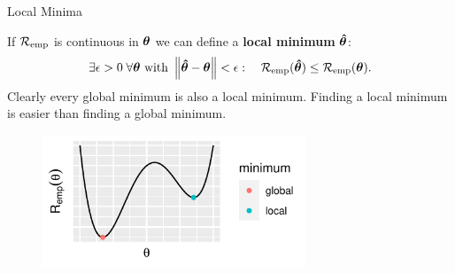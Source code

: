 \documentclass[11pt,compress,t,notes=noshow, xcolor=table]{beamer}
\begin{document}
\begin{vbframe}{Local Minima}

If $\mathcal{R}_{\text{emp}}$ is continuous in $\bm{\theta}$ we can define a \textbf{local minimum} $\bm{\hat\theta}$:
\[
\exists \epsilon > 0\; \forall \bm{\theta} \text{ with } \left\Vert\bm{\hat\theta} - \bm{\theta}\right\Vert < \epsilon: \quad \mathcal{R}_{\text{emp}}(\bm{\hat\theta}) \leq \mathcal{R}_{\text{emp}}(\bm{\theta}) .
\]
Clearly every global minimum is also a local minimum.
Finding a local minimum is easier than finding a global minimum.

\begin{center}
\begin{figure}[!b]
\includegraphics[width=0.7\textwidth]{figure/g_l_min}
\end{figure}
\end{center}

\end{vbframe}
\end{document}
